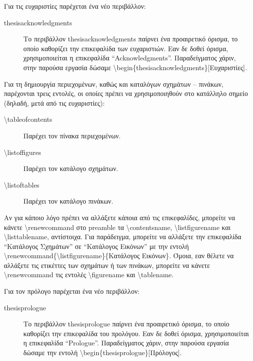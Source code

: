 \documentclass{dithesis}
\begin{document}
Για τις ευχαριστίες παρέχεται ένα νέο περιβάλλον:
\begin{description}
\item[thesisacknowledgments]
  Το περιβάλλον thesisacknowledgments παίρνει ένα προαιρετικό όρισμα, το οποίο 
  καθορίζει την επικεφαλίδα των ευχαριστιών.
  Εαν δε δοθεί όρισμα, χρησιμοποιείται η επικεφαλίδα ``Acknowledgments''.
  Παραδείγματος χάριν, στην παρούσα εργασία δώσαμε
  \textbackslash{begin}\{thesisacknowledgments\}{[Ευχαριστίες]}.
\end{description}

Για τη δημιουργία περιεχομένων, καθώς και καταλόγων σχημάτων -- πινάκων,
παρέχονται τρεις εντολές, οι οποίες πρέπει να χρησιμοποιηθούν στο κατάλληλο
σημείο (δηλαδή, μετά από τις ευχαριστίες):
\begin{description}
\item[\textbackslash{tableofcontents}]
  Παρέχει τον πίνακα περιεχομένων.
\item[\textbackslash{listoffigures}]
  Παρέχει τον κατάλογο σχημάτων.
\item[\textbackslash{listoftables}]
  Παρέχει τον κατάλογο πινάκων.
\end{description}

Αν για κάποιο λόγο πρέπει να αλλάξετε κάποια από τις επικεφαλίδες, μπορείτε να
κάνετε \textbackslash{renewcommand} στο preamble τα 
\textbackslash{contentsname}, \textbackslash{listfigurename} και 
\textbackslash{listtablename}, αντίστοιχα.
Για παράδειγμα, μπορείτε να αλλάξετε την επικεφαλίδα ``Κατάλογος Σχημάτων'' σε
``Κατάλογος Εικόνων'' με την εντολή 
\textbackslash{renewcommand}\{\textbackslash{listfigurename}\}\{Κατάλογος
Εικόνων\}.
Όμοια, εαν θέλετε να αλλάξετε τις ετικέττες των σχημάτων ή των πινάκων, μπορείτε
να κάνετε \textbackslash{renewcommand} τις εντολές \textbackslash{figurename}
και \textbackslash{tablename}.

Για τον πρόλογο παρέχεται ένα νέο περιβάλλον:
\begin{description}
\item[thesisprologue]
  Το περιβάλλον thesisprologue παίρνει ένα προαιρετικό όρισμα, το οποίο 
  καθορίζει την επικεφαλίδα του προλόγου.
  Εαν δε δοθεί όρισμα, χρησιμοποιείται η επικεφαλίδα ``Prologue''.
  Παραδείγματος χάριν, στην παρούσα εργασία δώσαμε την εντολή
  \textbackslash{begin}\{thesisprologue\}{[Πρόλογος]}.
\end{description}
\end{document}
